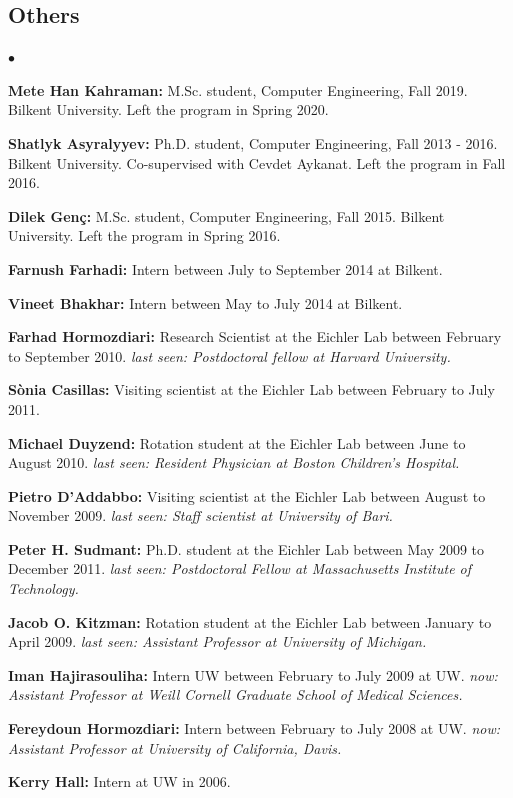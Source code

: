 \documentclass[margin,line]{res}
\newenvironment{list2}{
  \begin{list}{$\bullet$}{%
      \setlength{\itemsep}{0.1cm}
      \setlength{\parsep}{0in} \setlength{\parskip}{0in}
      \setlength{\topsep}{0in} \setlength{\partopsep}{0in} 
      \setlength{\leftmargin}{0.2in}}}{\end{list}}
\begin{document}
\begin{resume}
\subsection{\small \sc Others}
\begin{list2}
\item
  {\bf Mete Han Kahraman:} M.Sc. student, Computer Engineering, Fall 2019.  
  Bilkent University. Left the program in Spring 2020.
\item
  {\bf Shatlyk Asyralyyev:} Ph.D. student, Computer Engineering, Fall 2013 - 2016.
  Bilkent University. Co-supervised with Cevdet Aykanat. Left the program in Fall 2016.
\item
{\bf Dilek Genç:} M.Sc. student, Computer Engineering, Fall 2015.
  Bilkent University. Left the program in Spring 2016. 
\item
  {\bf Farnush Farhadi:} Intern between July to September 2014 at Bilkent.
\item
  {\bf Vineet Bhakhar:} Intern between May to July 2014 at Bilkent. 
\item
  {\bf Farhad Hormozdiari:} Research Scientist at the Eichler Lab between February to September 2010.
  {\it last seen: Postdoctoral fellow  at Harvard University.}
\item
  {\bf S\`{o}nia Casillas:} Visiting scientist at the Eichler Lab between February to July 2011.
\item
  {\bf Michael Duyzend:} Rotation student at the Eichler Lab between June to August 2010.
  {\it last seen:  Resident Physician at Boston Children's Hospital.}
\item
  {\bf Pietro D'Addabbo:} Visiting scientist at the Eichler Lab between August to November 2009.
  {\it last seen: Staff scientist at University of Bari.}
\item
  {\bf Peter H. Sudmant:} Ph.D. student at the Eichler Lab between May 2009 to December 2011.
  {\it last seen: Postdoctoral Fellow at Massachusetts Institute of Technology.}
\item
  {\bf Jacob O. Kitzman:} Rotation student at the Eichler Lab between January to April 2009.
  {\it last seen: Assistant Professor at University of Michigan.}
\item
  {\bf Iman Hajirasouliha:}  Intern UW between February to July 2009 at UW.
  {\it now: Assistant Professor at Weill Cornell Graduate School of Medical Sciences.}
\item
  {\bf Fereydoun Hormozdiari:} Intern between February to July 2008 at UW. 
  {\it now: Assistant Professor at University of California, Davis.}
\item
  {\bf Kerry Hall:} Intern at UW in 2006.  
\end{list2}


\end{resume}
\end{document}
